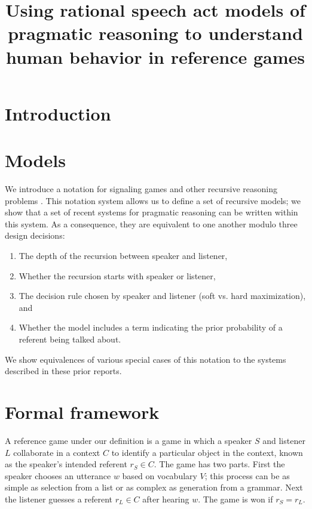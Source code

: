 \documentclass[man,noapacite]{apa2}
\title{\vspace{-10ex}Using rational speech act models of pragmatic reasoning to understand human behavior in reference games}
\begin{document}
\maketitle                            


\section{Introduction}


\section{Models}

We introduce a notation for signaling games and other recursive reasoning problems \cite{golland2010,franke2012,frank2012}. This notation system allows us to define a set of recursive models; we show that a set of recent systems for pragmatic reasoning can be written within this system. As a consequence, they are equivalent to one another modulo three design decisions: 

\begin{enumerate}
\item The depth of the recursion between speaker and listener,
\item Whether the recursion starts with speaker or listener,
\item The decision rule chosen by speaker and listener (soft vs. hard maximization), and 
\item Whether the model includes a term indicating the prior probability of a referent being talked about.
\end{enumerate}

\noindent We show equivalences of various special cases of this notation to the systems described in these prior reports.

\section{Formal framework}

A reference game under our definition is a game in which a speaker $S$ and listener $L$ collaborate in a context $C$ to identify a particular object in the context, known as the speaker's intended referent $r_S \in C$. The game has two parts. First the speaker chooses an utterance $w$ based on vocabulary $V$; this process can be as simple as selection from a list or as complex as generation from a grammar. Next the listener guesses a referent $r_L \in C$ after hearing $w$. The game is won if $r_S=r_L$.
\end{document}

